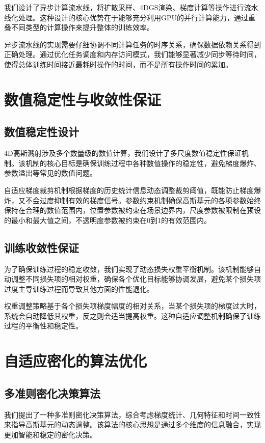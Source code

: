 我们设计了异步计算流水线，将扩散采样、4DGS渲染、梯度计算等操作进行流水线化处理。这种设计的核心优势在于能够充分利用GPU的并行计算能力，通过重叠不同类型的计算操作来提升整体的训练效率。

异步流水线的实现需要仔细协调不同计算任务的时序关系，确保数据依赖关系得到正确处理。通过优化任务调度和内存访问模式，我们能够显著减少同步等待时间，使得总体训练时间接近最耗时操作的时间，而不是所有操作时间的累加。

\section{数值稳定性与收敛性保证}

\subsection{数值稳定性设计}

4D高斯溅射涉及多个数量级的数值计算，我们设计了多尺度数值稳定性保证机制。该机制的核心目标是确保训练过程中各种数值操作的稳定性，避免梯度爆炸、参数溢出等常见的数值问题。

自适应梯度裁剪机制根据梯度的历史统计信息动态调整裁剪阈值，既能防止梯度爆炸，又不会过度抑制有效的梯度信号。参数约束机制确保高斯基元的各项参数始终保持在合理的数值范围内，位置参数被约束在场景边界内，尺度参数被限制在预设的最小和最大值之间，不透明度参数被约束在0到1的有效范围内。

\subsection{训练收敛性保证}

为了确保训练过程的稳定收敛，我们实现了动态损失权重平衡机制。该机制能够自动调整不同损失项的相对权重，确保各个优化目标能够协调发展，避免某个损失项过度主导训练过程而导致其他方面的性能退化。

权重调整策略基于各个损失项梯度幅度的相对关系，当某个损失项的梯度过大时，系统会自动降低其权重，反之则会适当提高权重。这种自适应调整机制确保了训练过程的平衡性和稳定性。

\section{自适应密化的算法优化}

\subsection{多准则密化决策算法}

我们提出了一种多准则密化决策算法，综合考虑梯度统计、几何特征和时间一致性来指导高斯基元的动态调整。该算法的核心思想是通过多个维度的信息融合，实现更加智能和稳定的密化决策。

